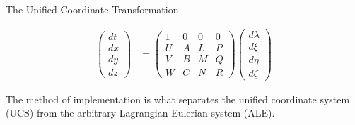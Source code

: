 \documentclass{beamer}
\begin{document}
\begin{frame}{The Unified Coordinate Transformation}

\begin{align}
\label{eq:coordinate_transformation}
\left(
\begin{array}{c}
dt\\dx\\dy\\dz
\end{array}
\right) &= \left(
\begin{array}{cccc}
1 & 0 & 0 & 0 \\
U & A & L & P \\
V & B & M & Q \\
W & C & N & R \end{array} \right)
\left( \begin{array}{c}
d\lambda\\d\xi\\d\eta\\d\zeta \end{array} \right)
\end{align}

The method of implementation is what separates the unified coordinate
system (UCS) from the arbitrary-Lagrangian-Eulerian system (ALE).

\end{frame}
\end{document}
